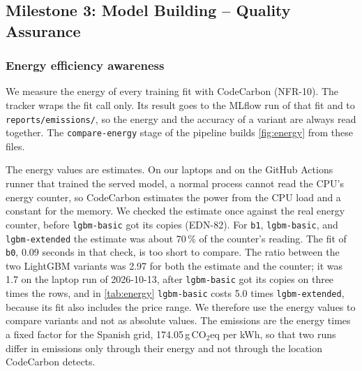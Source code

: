 \subsection{Milestone 3: Model Building -- Quality Assurance}
\label{sec:m3}

\subsubsection{Energy efficiency awareness}
\label{sec:m3-energy}

We measure the energy of every training fit with CodeCarbon (NFR-10).
The tracker wraps the fit call only.
Its result goes to the MLflow run of that fit and to \texttt{reports/\allowbreak emissions/}, so the energy and the accuracy of a variant are always read together.
The \texttt{compare-energy} stage of the pipeline builds \cref{fig:energy} from these files.

The energy values are estimates.
On our laptops and on the GitHub Actions runner that trained the served model, a normal process cannot read the CPU's energy counter, so CodeCarbon estimates the power from the CPU load and a constant for the memory.
We checked the estimate once against the real energy counter, before \texttt{lgbm-basic} got its copies (EDN-82).
For \texttt{b1}, \texttt{lgbm-basic}, and \texttt{lgbm-extended} the estimate was about 70\,\% of the counter's reading.
The fit of \texttt{b0}, 0.09 seconds in that check, is too short to compare.
The ratio between the two LightGBM variants was 2.97 for both the estimate and the counter; it was 1.7 on the laptop run of 2026-10-13, after \texttt{lgbm-basic} got its copies on three times the rows, and in \cref{tab:energy} \texttt{lgbm-basic} costs 5.0 times \texttt{lgbm-extended}, because its fit also includes the price range.
We therefore use the energy values to compare variants and not as absolute values.
The emissions are the energy times a fixed factor for the Spanish grid, 174.05\,g\,CO$_2$eq per kWh, so that two runs differ in emissions only through their energy and not through the location CodeCarbon detects.

